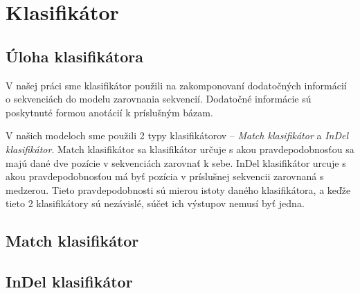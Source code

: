 \chapter{Klasifikátor}

\section{Úloha klasifikátora}

V našej práci sme klasifikátor použili na zakomponovaní dodatočných informácií o sekvenciách do modelu zarovnania sekvencií. Dodatočné informácie sú poskytnuté formou anotácií k príslušným bázam.

V našich modeloch sme použili 2 typy klasifikátorov -- \textit{Match klasifikátor} a \textit{InDel klasifikátor}. Match klasifikátor sa klasifikátor určuje s akou pravdepodobnosťou sa majú dané dve pozície v sekvenciách zarovnať k sebe. InDel klasifikátor urcuje s akou pravdepodobnosťou má byť pozícia v príslušnej sekvencii zarovnaná s medzerou. Tieto pravdepodobnosti sú mierou istoty daného klasifikátora, a keďže tieto 2 klasifikátory sú nezávislé, súčet ich výstupov nemusí byť jedna.

\section{Match klasifikátor}

\section{InDel klasifikátor}

